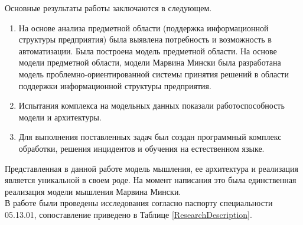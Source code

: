 
Основные результаты работы заключаются в следующем.
\begin{enumerate}
  \item На основе анализа предметной области (поддержка информационной структуры предприятия) была выявлена потребность и возможность в автоматизации. Была построена модель предметной области. На основе модели предметной области, модели Марвина Мински была разработана модель проблемно-ориентированной системы принятия решений в области поддержки информационной структуры предприятия.  
  \item Испытания комплекса на модельных данных показали работоспособность модели и архитектуры.  
  \item Для выполнения поставленных задач был создан программный комплекс обработки, решения инцидентов и обучения на естественном языке. 
\end{enumerate}

Представленная в данной работе модель мышления, ее архитектура и реализация является уникальной в своем роде. На момент написания это была единственная реализация модели мышления Марвина Мински. \\
В работе были проведены исследования согласно паспорту специальности 05.13.01, сопоставление приведено в Таблице \ref{ResearchDescription}.


